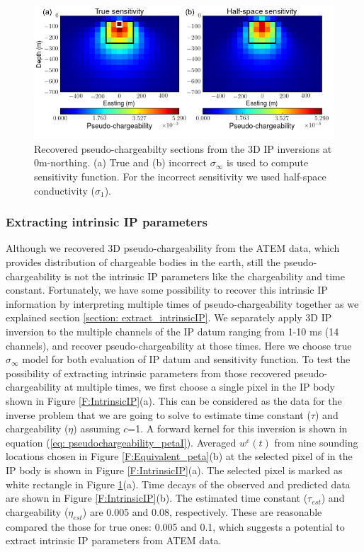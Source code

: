 \documentclass[a4paper, 11pt]{article}
\newcommand{\siginf}{\sigma_\infty}
\begin{document}
\begin{figure}[htb]
  \centering
  \includegraphics[width=1.\textwidth]{figures/True_vs_approx_sensitivity.png}
  \caption{Recovered pseudo-chargeabilty sections from the 3D IP inversions at 0m-northing.  (a) True and (b) incorrect $\siginf$ is used to compute sensitivity function. For the incorrect sensitivity we used half-space conductivity ($\sigma_1$).}
  \label{F:True_vs_approx_sensitivity}
\end{figure}
\clearpage

\subsubsection{Extracting intrinsic IP parameters}
Although we recovered 3D pseudo-chargeability from the ATEM data, which provides distribution of chargeable bodies in the earth, still the pseudo-chargeability is not the intrinsic IP  parameters like the chargeability and time constant.
Fortunately, we have some possibility to recover this intrinsic IP information by interpreting multiple times of pseudo-chargeability together as we explained section \ref{section: extract_intrinsicIP}. 
We separately apply 3D IP inversion to the multiple channels of the IP datum ranging from 1-10 ms (14 channels), and recover pseudo-chargeability at those times. 
Here we choose true $\siginf$ model for both evaluation of IP datum and sensitivity function. 
To test the possibility of extracting intrinsic parameters from those recovered pseudo-chargeability at multiple times, we first choose a single pixel in the IP body shown in Figure \ref{F:IntrinsicIP}(a).  
This can be considered as the data for the inverse problem that we are going to solve to  estimate time constant ($\tau$) and chargeability ($\eta$) assuming $c$=1. 
A forward kernel for this inversion is shown in equation (\ref{eq: pseudochargeability_petaI}). 
Averaged $w^e(t)$ from nine sounding locations chosen in Figure \ref{F:Equivalent_peta}(b) at the selected pixel of in the IP body is shown in Figure \ref{F:IntrinsicIP}(a).
The selected pixel is marked as white rectangle in Figure \ref{F:True_vs_approx_sensitivity}(a).  
Time decays of the observed and predicted data are shown in Figure \ref{F:IntrinsicIP}(b).
The estimated time constant ($\tau_{est}$) and chargeability ($\eta_{est}$) are 0.005 and 0.08, respectively. 
These are reasonable compared the those for true ones: 0.005 and 0.1, which suggests a potential to extract intrinsic IP parameters from ATEM data. 
\end{document}
